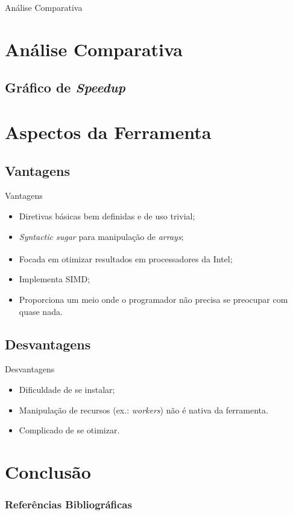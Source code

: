 \documentclass{beamer}
\begin{document}
\begin{frame}{Análise Comparativa}
\section{Análise Comparativa}
\subsection{Gráfico de \protect\textit{Speedup}}
\end{frame}

\section{Aspectos da Ferramenta}
\subsection{Vantagens}
\begin{frame}{Vantagens}
\begin{itemize}
    \item Diretivas básicas bem definidas e de uso trivial;
    \item \textit{Syntactic sugar} para manipulação de \textit{arrays};
    \item Focada em otimizar resultados em processadores da
    Intel\textsuperscript{\textregistered};
    \item Implementa SIMD;
    \item Proporciona um meio onde o programador não precisa se preocupar com
    quase nada.
\end{itemize}
\end{frame}



\subsection{Desvantagens}
\begin{frame}{Desvantagens}
\begin{itemize}
    \item Dificuldade de se instalar;
    \item Manipulação de recursos (ex.: \textit{workers}) não é nativa da
    ferramenta.
    \item Complicado de se otimizar.
\end{itemize}

\end{frame}


\section{Conclusão}
\begin{frame}%
    \frametitle{Referências Bibliográficas}
    \tiny{}
    
\end{frame}
\end{document}

